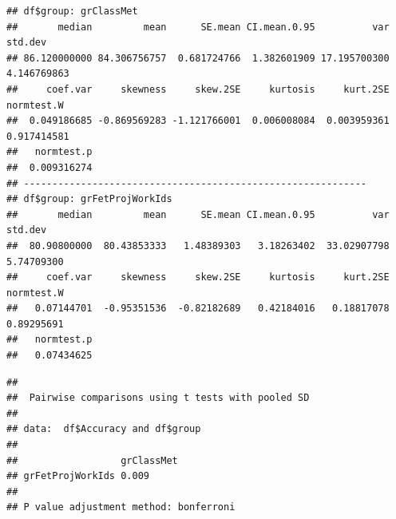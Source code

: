 \documentclass[
]{article}
\newenvironment{Shaded}{\begin{snugshade}}{\end{snugshade}}
\newcommand{\AttributeTok}[1]{\textcolor[rgb]{0.77,0.63,0.00}{#1}}
\newcommand{\ConstantTok}[1]{\textcolor[rgb]{0.00,0.00,0.00}{#1}}
\newcommand{\FunctionTok}[1]{\textcolor[rgb]{0.00,0.00,0.00}{#1}}
\newcommand{\NormalTok}[1]{#1}
\newcommand{\OtherTok}[1]{\textcolor[rgb]{0.56,0.35,0.01}{#1}}
\newcommand{\SpecialCharTok}[1]{\textcolor[rgb]{0.00,0.00,0.00}{#1}}
\newcommand{\StringTok}[1]{\textcolor[rgb]{0.31,0.60,0.02}{#1}}
\begin{document}
\begin{Shaded}
\end{Shaded}

\begin{verbatim}
## df$group: grClassMet
##       median         mean      SE.mean CI.mean.0.95          var      std.dev 
## 86.120000000 84.306756757  0.681724766  1.382601909 17.195700300  4.146769863 
##     coef.var     skewness     skew.2SE     kurtosis     kurt.2SE   normtest.W 
##  0.049186685 -0.869569283 -1.121766001  0.006008084  0.003959361  0.917414581 
##   normtest.p 
##  0.009316274 
## ------------------------------------------------------------ 
## df$group: grFetProjWorkIds
##       median         mean      SE.mean CI.mean.0.95          var      std.dev 
##  80.90800000  80.43853333   1.48389303   3.18263402  33.02907798   5.74709300 
##     coef.var     skewness     skew.2SE     kurtosis     kurt.2SE   normtest.W 
##   0.07144701  -0.95351536  -0.82182689   0.42184016   0.18817078   0.89295691 
##   normtest.p 
##   0.07434625
\end{verbatim}

\begin{Shaded}
\end{Shaded}

\begin{verbatim}
## 
##  Pairwise comparisons using t tests with pooled SD 
## 
## data:  df$Accuracy and df$group 
## 
##                  grClassMet
## grFetProjWorkIds 0.009     
## 
## P value adjustment method: bonferroni
\end{verbatim}
\end{document}
